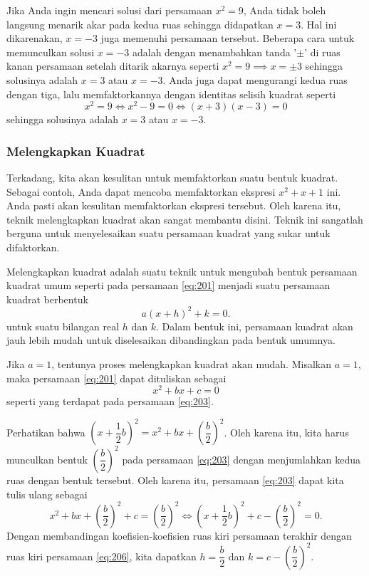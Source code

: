 		\begin{warningbox}
			Jika Anda ingin mencari solusi dari persamaan $ x^{2} = 9 $, Anda tidak boleh langsung menarik akar pada kedua ruas sehingga didapatkan $ x = 3 $. Hal ini dikarenakan, $ x = -3 $ juga memenuhi persamaan tersebut. Beberapa cara untuk memunculkan solusi $ x = -3 $ adalah dengan menambahkan tanda '$ \pm $' di ruas kanan persamaan setelah ditarik akarnya seperti $ x^{2} = 9 \implies x = \pm 3 $ sehingga solusinya adalah $ x = 3 $ atau $ x = -3 $. Anda juga dapat mengurangi kedua ruas dengan tiga, lalu memfaktorkannya dengan identitas selisih kuadrat seperti
			\[ x^{2} = 9 \iff x^{2} - 9 = 0 \iff \left(x + 3\right)\left(x - 3\right) = 0 \]
			sehingga solusinya adalah $ x = 3 $ atau $ x = -3 $.
		\end{warningbox}
		
	\subsubsection{Melengkapkan Kuadrat}
	
		Terkadang, kita akan kesulitan untuk memfaktorkan suatu bentuk kuadrat. Sebagai contoh, Anda dapat mencoba memfaktorkan ekspresi $ x^{2} + x + 1 $ ini. Anda pasti akan kesulitan memfaktorkan ekspresi tersebut. Oleh karena itu, teknik melengkapkan kuadrat akan sangat membantu disini. Teknik ini sangatlah berguna untuk menyelesaikan suatu persamaan kuadrat yang sukar untuk difaktorkan.
		
		\par Melengkapkan kuadrat adalah suatu teknik untuk mengubah bentuk persamaan kuadrat umum seperti pada persamaan \ref{eq:201} menjadi suatu persamaan kuadrat berbentuk
		\begin{equation} \label{eq:206}
			a\left(x + h\right)^{2} + k = 0.
		\end{equation}
		untuk suatu bilangan real $ h $ dan $ k $. Dalam bentuk ini, persamaan kuadrat akan jauh lebih mudah untuk diselesaikan dibandingkan pada bentuk umumnya.
		
		\par Jika $ a = 1 $, tentunya proses melengkapkan kuadrat akan mudah. Misalkan $ a = 1 $, maka persamaan \ref{eq:201} dapat dituliskan sebagai
		\[ x^{2} + bx + c = 0 \]
		seperti yang terdapat pada persamaan \ref{eq:203}.
		\par \noindent Perhatikan bahwa $ \left(x + \dfrac{1}{2}b\right)^{2} = x^{2} + bx + \left(\dfrac{b}{2}\right)^{2} $. Oleh karena itu, kita harus munculkan bentuk $ \left(\dfrac{b}{2}\right)^{2} $ pada persamaan \ref{eq:203} dengan menjumlahkan kedua ruas dengan bentuk tersebut. Oleh karena itu, persamaan \ref{eq:203} dapat kita tulis ulang sebagai
		\[ x^{2} + bx + \left(\frac{b}{2}\right)^{2} + c = \left(\frac{b}{2}\right)^{2} \iff \left(x + \frac{1}{2}b\right)^{2} + c - \left(\frac{b}{2}\right)^{2} = 0. \]
		Dengan membandingan koefisien-koefisien ruas kiri persamaan terakhir dengan ruas kiri persamaan \ref{eq:206}, kita dapatkan $ h = \dfrac{b}{2} $ dan $ k = c - \left(\dfrac{b}{2}\right)^{2} $.
		
